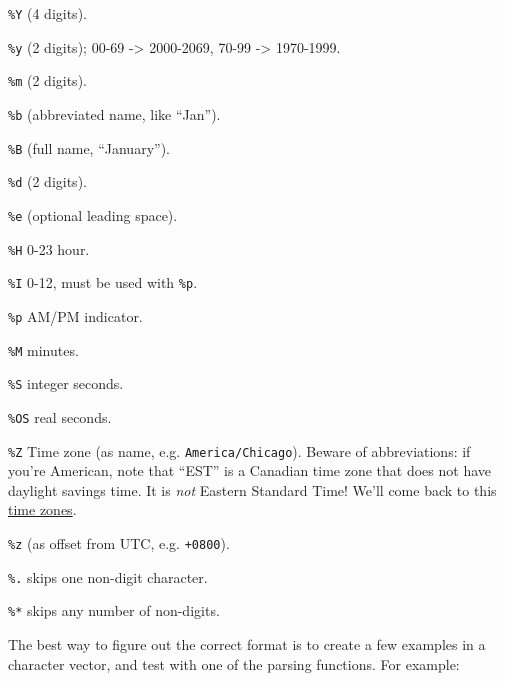\documentclass[]{book}
\newenvironment{Shaded}{\begin{snugshade}}{\end{snugshade}}
\newcommand{\KeywordTok}[1]{\textcolor[rgb]{0.13,0.29,0.53}{\textbf{{#1}}}}
\newcommand{\StringTok}[1]{\textcolor[rgb]{0.31,0.60,0.02}{{#1}}}
\newcommand{\CommentTok}[1]{\textcolor[rgb]{0.56,0.35,0.01}{\textit{{#1}}}}
\newcommand{\NormalTok}[1]{{#1}}
\providecommand{\tightlist}{%
  \setlength{\itemsep}{0pt}\setlength{\parskip}{0pt}}
\begin{document}
\begin{description}
\tightlist
\item[Year]
\texttt{\%Y} (4 digits).

\texttt{\%y} (2 digits); 00-69 -\textgreater{} 2000-2069, 70-99
-\textgreater{} 1970-1999.
\item[Month]
\texttt{\%m} (2 digits).

\texttt{\%b} (abbreviated name, like ``Jan'').

\texttt{\%B} (full name, ``January'').
\item[Day]
\texttt{\%d} (2 digits).

\texttt{\%e} (optional leading space).
\item[Time]
\texttt{\%H} 0-23 hour.

\texttt{\%I} 0-12, must be used with \texttt{\%p}.

\texttt{\%p} AM/PM indicator.

\texttt{\%M} minutes.

\texttt{\%S} integer seconds.

\texttt{\%OS} real seconds.

\texttt{\%Z} Time zone (as name, e.g. \texttt{America/Chicago}). Beware
of abbreviations: if you're American, note that ``EST'' is a Canadian
time zone that does not have daylight savings time. It is \emph{not}
Eastern Standard Time! We'll come back to this
\protect\hyperlink{time-zones}{time zones}.

\texttt{\%z} (as offset from UTC, e.g. \texttt{+0800}).
\item[Non-digits]
\texttt{\%.} skips one non-digit character.

\texttt{\%*} skips any number of non-digits.
\end{description}

The best way to figure out the correct format is to create a few
examples in a character vector, and test with one of the parsing
functions. For example:

\begin{Shaded}
\end{Shaded}
\end{document}
